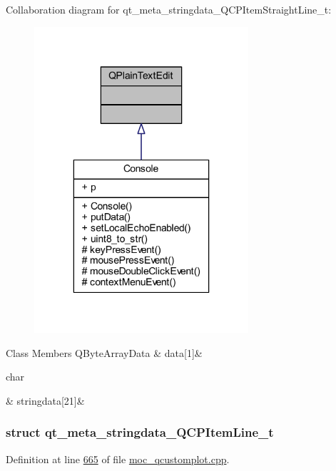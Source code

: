 Collaboration diagram for qt\+\_\+meta\+\_\+stringdata\+\_\+\+Q\+C\+P\+Item\+Straight\+Line\+\_\+t\+:
\nopagebreak
\begin{figure}[H]
\begin{center}
\leavevmode
\includegraphics[width=225pt]{db/d7b/a00296}
\end{center}
\end{figure}
\begin{DoxyFields}{Class Members}
\hypertarget{a00067_a86cfd75cdbd69fb7bac81f44368368a2}{Q\+Byte\+Array\+Data}\label{a00067_a86cfd75cdbd69fb7bac81f44368368a2}
&
data\mbox{[}1\mbox{]}&
\\
\hline

\hypertarget{a00067_a4fcd4918ec3f5999a6ee9ce08ebcdb96}{char}\label{a00067_a4fcd4918ec3f5999a6ee9ce08ebcdb96}
&
stringdata\mbox{[}21\mbox{]}&
\\
\hline

\end{DoxyFields}
\label{dd/de3/a00201}
\hypertarget{a00067_dd/de3/a00201}{}
\subsubsection{struct qt\+\_\+meta\+\_\+stringdata\+\_\+\+Q\+C\+P\+Item\+Line\+\_\+t}


Definition at line \hyperlink{a00067_source_l00665}{665} of file \hyperlink{a00067_source}{moc\+\_\+qcustomplot.\+cpp}.



